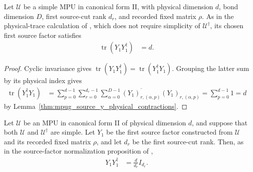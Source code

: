 \begin{lemma}
    \label{thm:mpug_source_y_one_gram_trace}
    \leanok
    Let $\mathcal U$ be a simple MPU in canonical form II, with physical
    dimension $d$, bond dimension $D$, first source-cut rank $d_r$, and
    recorded fixed matrix $\rho$. As in the physical-trace calculation of
    \cite[line~1398]{FrancoRubio2025MPUGauging}, which does not require
    simplicity of $\mathcal U^\dagger$, its chosen first source factor
    satisfies
    \begin{align}
        \operatorname{tr}(Y_1Y_1^\dagger) & =d.
    \end{align}
\end{lemma}

\begin{proof}\leanok
    Cyclic invariance gives
    $\operatorname{tr}(Y_1Y_1^\dagger)=\operatorname{tr}(Y_1^\dagger Y_1)$.
    Grouping the latter sum by its physical index gives
    \begin{align}
        \operatorname{tr}(Y_1^\dagger Y_1)
         & =\sum_{p=0}^{d-1}\sum_{r=0}^{d_r-1}\sum_{\alpha=0}^{D-1}
        \overline{(Y_1)_{r,(\alpha,p)}}(Y_1)_{r,(\alpha,p)}
        =\sum_{p=0}^{d-1}1=d
    \end{align}
    by Lemma~\ref{thm:mpug_source_y_physical_contractions}.
\end{proof}

\begin{lemma}
    \label{thm:mpug_source_y_one_normalization}
    \leanok
    Let $\mathcal U$ be an MPU in canonical form II of physical dimension
    $d$, and suppose that both $\mathcal U$ and $\mathcal U^\dagger$ are
    simple. Let $Y_1$ be the first source factor constructed from
    $\mathcal U$ and its recorded fixed matrix $\rho$, and let $d_r$ be
    the first source-cut rank. Then, as in the source-factor normalization
    proposition of \cite[lines~1064--1119]{FrancoRubio2025MPUGauging},
    \begin{align}
        Y_1Y_1^\dagger & =\frac{d}{d_r}I_{d_r}.
    \end{align}
\end{lemma}

